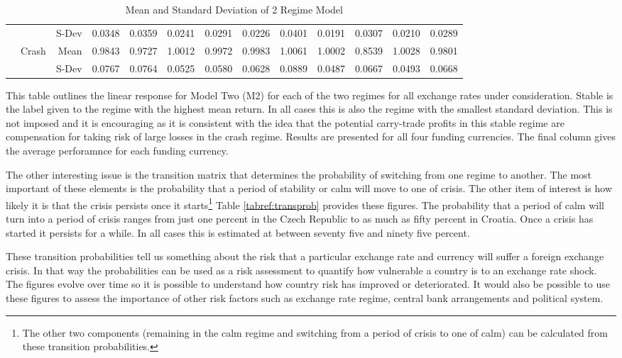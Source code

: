 \documentclass[12pt, a4paper, oneside]{article}\usepackage[]{graphicx}\usepackage[]{color}
\begin{document}
\begin{sidewaystable}[p]
\begin{threeparttable}
\begin{tabular}{llrrrrrrrrrrr}
 & & S-Dev &0.0348 & 0.0359 & 0.0241 & 0.0291 & 0.0226 & 0.0401 & 0.0191 & 0.0307 & 0.0210 & 0.0289 \\ 
  & \multirow{2}{*}{Crash}&Mean & 0.9843 & 0.9727 & 1.0012 & 0.9972 & 0.9983 & 1.0061 & 1.0002 & 0.8539 & 1.0028 & 0.9801 \\ 
  & & S-Dev& 0.0767 & 0.0764 & 0.0525 & 0.0580 & 0.0628 & 0.0889 & 0.0487 & 0.0667 & 0.0493 & 0.0668 \\ 
   \hline
\end{tabular}
\begin{tablenotes}
\small
\item
This table outlines the linear response for Model Two (M2) for each of the two regimes for all exchange rates under consideration.  Stable is the label given to the regime with the highest mean return.  In all cases this is also the regime with the smallest standard deviation. This is not imposed and it is encouraging as it is consistent with the idea that the potential carry-trade profits in this stable regime are compensation for taking risk of large losses in the crash regime.  Results are presented for all four funding currencies.  The final column gives the average perforamnce for each funding currency.     
\end{tablenotes}
\caption{Mean and Standard Deviation of 2 Regime Model}
\label{tabref:2stateresponse}
\end{threeparttable}
  \end{sidewaystable}

The other interesting issue is the transition matrix that determines the probability of switching from one regime to another. The most important of these elements is the probability that a period of stability or calm will move to one of crisis.  The other item of interest is how likely it is that the crisis persists once it starts\footnote{The other two components (remaining in the calm regime and switching from a period of crisis to one of calm) can be calculated from these transition probabilities.}  Table \ref{tabref:transprob} provides these figures.  The probability that a period of calm will turn into a period of crisis ranges from just one percent in the Czech Republic to as much as fifty percent in Croatia. Once a crisis has started it persists for a while. In all cases this is estimated at between seventy five and ninety five percent. 

These transition probabilities tell us something about the risk that a particular exchange rate and currency will suffer a foreign exchange crisis. In that way the probabilities can be used as a risk assessment to quantify how vulnerable a country is to an exchange rate shock. The figures evolve over time so it is possible to understand how country risk has improved or deteriorated.   It would also be possible to use these figures to assess the importance of other risk factors such as exchange rate regime, central bank arrangements and political system. 
\end{document}
